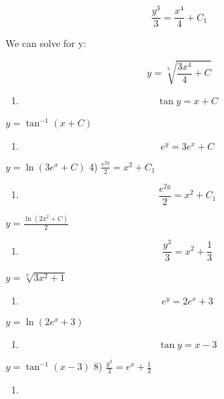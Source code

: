 \documentclass[
]{article}
\providecommand{\tightlist}{%
  \setlength{\itemsep}{0pt}\setlength{\parskip}{0pt}}
\begin{document}
\[\frac{y^3}{3} = \frac{x^4}{4} + C_1\]

We can solve for y:

\[y = \sqrt[3]{\frac{3x^4}{4} + C}\]

\begin{enumerate}
\def\labelenumi{\arabic{enumi})}
\setcounter{enumi}{1}
\tightlist
\item
  \[\tan y = x + C\]
\end{enumerate}

\(y = \tan^{-1} (x + C)\)

\begin{enumerate}
\def\labelenumi{\arabic{enumi})}
\setcounter{enumi}{2}
\tightlist
\item
  \[e^y = 3e^x + C\]
\end{enumerate}

\(y = \ln (3e^x + C)\) 4) \(\frac{e^{2y}}{2} = x^2 + C_1\)

\begin{enumerate}
\def\labelenumi{\arabic{enumi})}
\setcounter{enumi}{3}
\tightlist
\item
  \[\frac{e^{2y}}{2} = x^2 + C_1\]
\end{enumerate}

\(y = \frac{\ln(2x^2 + C)}{2}\)

\begin{enumerate}
\def\labelenumi{\arabic{enumi})}
\setcounter{enumi}{4}
\tightlist
\item
  \[\frac{y^3}{3} = x^2 + \frac{1}{3}\]
\end{enumerate}

\(y = \sqrt[3]{3x^2 + 1}\)

\begin{enumerate}
\def\labelenumi{\arabic{enumi})}
\setcounter{enumi}{5}
\tightlist
\item
  \[e^y = 2e^x + 3\]
\end{enumerate}

\(y = \ln (2e^x + 3)\)

\begin{enumerate}
\def\labelenumi{\arabic{enumi})}
\setcounter{enumi}{6}
\tightlist
\item
  \[\tan y = x - 3\]
\end{enumerate}

\(y = \tan^{-1}(x - 3)\) 8) \(\frac{y^3}{3} = e^x + \frac{1}{3}\)

\begin{enumerate}
\def\labelenumi{\arabic{enumi})}
\setcounter{enumi}{7}
\tightlist
\item
\end{enumerate}
\end{document}
